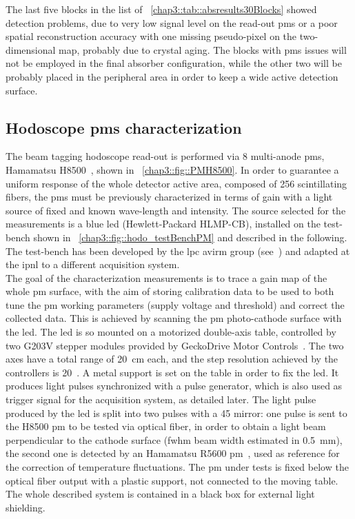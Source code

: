The last five blocks in the list of \tablename~\ref{chap3::tab::absresults30Blocks} showed detection problems, due to very low signal level on the read-out \glspl{pm} or a poor spatial reconstruction accuracy with one missing pseudo-pixel on the two-dimensional map, probably due to crystal aging. The blocks with \glspl{pm} issues will not be employed in the final absorber configuration, while the other two will be probably placed in the peripheral area in order to keep a wide active detection surface.   


\subsection{Hodoscope \glspl{pm} characterization}\label{chap3::subsec::hodoPMchar}         

The beam tagging hodoscope read-out is performed via 8 multi-anode \glspl{pm}, Hamamatsu H8500~\parencite{Hamamatsu2006}, shown in \figurename~\ref{chap3::fig::PMH8500}. In order to guarantee a uniform response of the whole detector active area, composed of 256 scintillating fibers, the \glspl{pm} must be previously characterized in terms of gain with a light source of fixed and known wave-length and intensity. The source selected for the measurements is a blue \gls{led} (Hewlett-Packard HLMP-CB), installed on the test-bench shown in \figurename~\ref{chap3::fig::hodo_testBenchPM} and described in the following. The test-bench has been developed by the \gls{lpc} \gls{avirm} group (see~\cite{Gaglione2013}) and adapted at the \gls{ipnl} to a different acquisition system.\\
The goal of the characterization measurements is to trace a gain map of the whole \gls{pm} surface, with the aim of storing calibration data to be used to both tune the \gls{pm} working parameters (supply voltage and threshold) and correct the collected data. This is achieved by scanning the \gls{pm} photo-cathode surface with the \gls{led}. The \gls{led} is so mounted on a motorized double-axis table, controlled by two G203V stepper modules provided by GeckoDrive Motor Controls~\parencite{GeckoDrive2010}. The two axes have a total range of 20~cm each, and the step resolution achieved by the controllers is 20~\charmum. A metal support is set on the table in order to fix the \gls{led}. It produces light pulses synchronized with a pulse generator, which is also used as trigger signal for the acquisition system, as detailed later. The light pulse produced by the \gls{led} is split into two pulses with a 45\textdegree{} mirror: one pulse is sent to the H8500 \gls{pm} to be tested via optical fiber, in order to obtain a light beam perpendicular to the cathode surface (\gls{fwhm} beam width estimated in 0.5~mm), the second one is detected by an Hamamatsu R5600 \gls{pm}~\parencite{Hamamatsu1995}, used as reference for the correction of temperature fluctuations. The \gls{pm} under tests is fixed below the optical fiber output with a plastic support, not connected to the moving table. The whole described system is contained in a black box for external light shielding.\\
